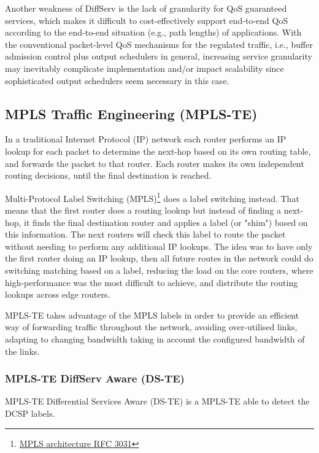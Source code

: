 Another weakness of DiffServ is the lack of granularity for QoS guaranteed services, which makes it difficult to cost-effectively support end-to-end QoS according to the end-to-end situation (e.g., path lengths) of applications. With the conventional packet-level QoS mechanisms for the regulated traffic, i.e., buffer admission control plus output schedulers in general, increasing service granularity may inevitably complicate implementation and/or impact scalability since sophisticated output schedulers seem necessary in this case.


\subsection{MPLS Traffic Engineering (MPLS-TE)}
\label{sec:mpls-te}
In a traditional Internet Protocol (IP) network each router performs an IP lookup for each packet to determine the next-hop based on its own routing table, and forwards the packet to that router. Each router makes its own independent routing decisions, until the final destination is reached.

Multi-Protocol Label Switching (MPLS)\footnote{\href{http://www.ietf.org/rfc/rfc3031.txt}{MPLS architecture RFC 3031}} does a label switching instead. That means that the first router does a routing lookup but instead of finding a next-hop, it finds the final destination router and applies a label (or "shim") based on this information. The next routers will check this label to route the packet without needing to perform any additional IP lookups. The idea was to have only the first router doing an IP lookup, then all future routes in the network could do switching matching based on a label, reducing the load on the core routers, where high-performance was the most difficult to achieve, and distribute the routing lookups across edge routers.

MPLS-TE takes advantage of the MPLS labels in order to provide an efficient way of forwarding traffic throughout the network, avoiding over-utilised links, adapting to changing bandwidth taking in account the configured bandwidth of the links.

\subsubsection{MPLS-TE DiffServ Aware (DS-TE)}

MPLS-TE Differential Services Aware (DS-TE) is a MPLS-TE able to detect the DCSP labels.


